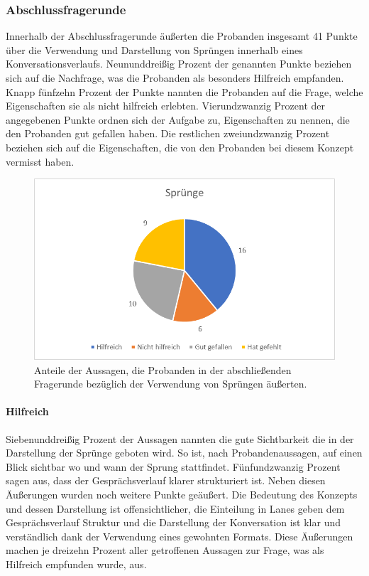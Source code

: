 \subsubsection{Abschlussfragerunde}
Innerhalb der Abschlussfragerunde äußerten die Probanden insgesamt 41 Punkte über die Verwendung und Darstellung von Sprüngen innerhalb eines Konversationsverlaufs. Neununddreißig Prozent der genannten Punkte beziehen sich auf die Nachfrage, was die Probanden als besonders Hilfreich empfanden. Knapp fünfzehn Prozent der Punkte nannten die Probanden auf die Frage, welche Eigenschaften sie als nicht hilfreich erlebten. Vierundzwanzig Prozent der angegebenen Punkte ordnen sich der Aufgabe zu, Eigenschaften zu nennen, die den Probanden gut gefallen haben. Die restlichen zweiundzwanzig Prozent beziehen sich auf die Eigenschaften, die von den Probanden bei diesem Konzept vermisst haben.  

\begin{figure}[h]
\centering
\includegraphics[width=1\textwidth]{pictures/diagramme/aussagenspr}
\caption{Anteile der Aussagen, die Probanden in der abschließenden Fragerunde bezüglich der Verwendung von Sprüngen äußerten.}
\label{aussagensichtb}
\end{figure}
 

\paragraph{Hilfreich} Siebenunddreißig Prozent der Aussagen nannten die gute Sichtbarkeit die in der Darstellung der Sprünge geboten wird. So ist, nach Probandenaussagen, auf einen Blick sichtbar wo und wann der Sprung stattfindet. Fünfundzwanzig Prozent sagen aus, dass der Gesprächsverlauf klarer strukturiert ist. Neben diesen Äußerungen wurden noch weitere Punkte geäußert. Die Bedeutung des Konzepts und dessen Darstellung ist offensichtlicher, die Einteilung in Lanes geben dem Gesprächsverlauf Struktur und die Darstellung der Konversation ist klar und verständlich dank der Verwendung eines gewohnten Formats. Diese Äußerungen machen je dreizehn Prozent aller getroffenen Aussagen zur Frage, was als Hilfreich empfunden wurde, aus.

